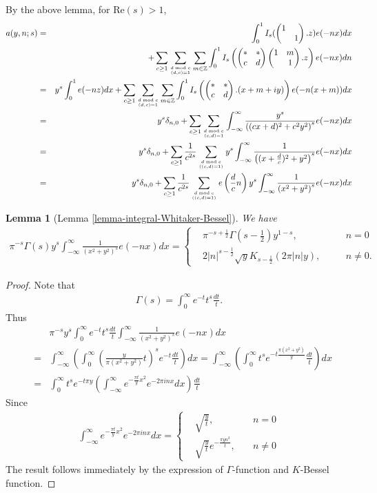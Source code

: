\documentclass[11pt,reqno]{amsart}
\newcommand{\bna}{\begin{eqnarray*}}
\newcommand{\ena}{\end{eqnarray*}}
\newcommand{\bma}{\begin{pmatrix}}
\newcommand{\ema}{\end{pmatrix}}
\def\re{{\mathrm{Re}}}
\def\Z{\mathbb{Z}}
\newtheorem{lemma}{Lemma}[section]
\theoremstyle{definition}
\begin{document}
By the above lemma, for $\re(s)>1$,
\bna
a(y,n;s)&=&\int_0^1 I_s(\bma1\\&1\ema.z)e(-nx)dx \\
&&+\sum_{c\geq1}\sum_{d\bmod c\atop(d,c)=1}
\sum_{m\in\Z}\int_0^1 I_s\left(\bma *&*\\ c&d\ema\bma 1&m\\&1\ema.z\right)e(-nx)dn\\
&=&y^s\int_0^1 e(-nz)dx+\sum_{c\geq 1}\sum_{d \bmod c\atop (d,c)=1}\sum_{m\in\Z}
\int_{0}^1I_s\left(\bma *&*\\ c&d\ema. (x+m+iy)\right) e(-n(x+m))dx\\
&=&y^s\delta_{n,0} + \sum_{c\geq 1}\sum_{d\bmod c\atop(c,d)=1}
\int_{-\infty}^\infty\frac{y^s}{\left((cx+d)^2+c^2y^2\right)^s}e(-nx)dx\\
&=&y^s\delta_{n,0} + \sum_{c\geq 1}\frac{1}{c^{2s}}\sum_{d\bmod c\atop((c,d)=1)}
y^s
\int_{-\infty}^\infty\frac{1}{\left((x+\frac{d}{c})^2+y^2\right)^s}e(-nx)dx\\
&=&y^s\delta_{n,0} + \sum_{c\geq 1}\frac{1}{c^{2s}}\sum_{d\bmod c\atop((c,d)=1)}e\left(\frac{d}{c}n\right)
y^s
\int_{-\infty}^\infty\frac{1}{\left(x^2+y^2\right)^s}e(-nx)dx
\ena
\begin{lemma}[Lemma \ref{lemma-integral-Whitaker-Bessel}]\label{lemma-integral-in-bump}
We have
\bna
\pi^{-s}\Gamma(s)y^s\int_{-\infty}^\infty\frac{1}{(x^2+y^2)^s}e(-nx)dx
=\left\{
\begin{aligned}
&\pi^{-s+\frac{1}{2}}\Gamma(s-\frac{1}{2})y^{1-s},\quad && n=0\\
&2|n|^{s-\frac{1}{2}}\sqrt{y}K_{s-\frac{1}{2}}(2\pi|n|y),\quad &&n\neq 0.
\end{aligned}
\right.
\ena
\end{lemma}
\begin{proof}
Note that
\bna
\Gamma(s)=\int_0^\infty e^{-t}t^{s}\frac{dt}{t}.
\ena
Thus
\bna
&&\pi^{-s}y^s\int_{0}^\infty e^{-t}t^s\frac{dt}{t}
\int_{-\infty}^\infty\frac{1}{(x^2+y^2)^s}e(-nx)dx\\
&=&\int_{-\infty}^\infty\left(\int_0^\infty
\left(\frac{y}{\pi(x^2+y^2)}t\right)^{s} e^{-t}\frac{dt}{t}
\right)dx
=\int_{-\infty}^\infty\left(\int_0^\infty
t^{s} e^{-t\frac{\pi(x^2+y^2)}{y}}\frac{dt}{t}
\right)dx\\
&=&\int_0^\infty
t^{s} e^{-t\pi y}
\left(\int_{-\infty}^\infty
 e^{-\frac{\pi t}{y}x^2} e^{-2\pi i n x}dx\right)
 \frac{dt}{t}
\ena
Since
\bna
\int_{-\infty}^\infty
 e^{-\frac{\pi t}{y}x^2} e^{-2\pi i n x}dx=\left\{
 \begin{aligned}
 &\sqrt{\frac{y}{t}},\quad &n=0\\
 &\sqrt{\frac{y}{t}}e^{-\frac{\pi y n^2}{t}},\quad &n\neq 0
 \end{aligned}
 \right.
\ena
The result follows immediately by the expression of $\Gamma$-function and $K$-Bessel
function.
\end{proof}
\end{document}
